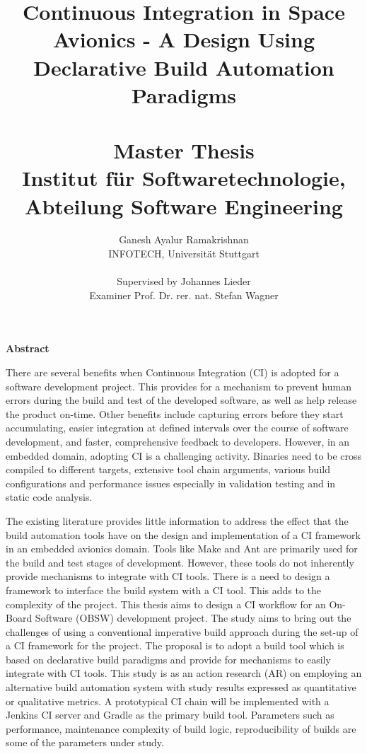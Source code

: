 \documentclass[12pt, a4paper, titlepage]{scrartcl}
\title{Continuous Integration in Space Avionics - A Design Using Declarative Build Automation Paradigms\\
\ \\
{\large Master Thesis \\
	Institut für Softwaretechnologie, \\
	Abteilung Software Engineering
\\
}
}
\author{Ganesh Ayalur Ramakrishnan  \\
  INFOTECH, Universität Stuttgart  \\
  \\
  Supervised by Johannes Lieder \\
  Examiner Prof. Dr. rer. nat. Stefan Wagner
}
\begin{document}
\maketitle

\textbf{Abstract}
\par There are several benefits when Continuous Integration (CI) is adopted for a software
development project. This provides for a mechanism to prevent human errors during
the build and test of the developed software, as well as help release the product on-time.
Other benefits include capturing errors before they start accumulating, easier integration
at defined intervals over the course of software development, and faster, comprehensive
feedback to developers. However, in an embedded domain, adopting CI is a challenging
activity. Binaries need to be cross compiled to different targets, extensive tool chain
arguments, various build configurations and performance issues especially in validation
testing and in static code analysis.
\par The existing literature provides little information to address the effect that the build
automation tools have on the design and implementation of a CI framework in an embedded
avionics domain. Tools like Make and Ant are primarily used for the build and
test stages of development. However, these tools do not inherently provide mechanisms
to integrate with CI tools. There is a need to design a framework to interface the build
system with a CI tool. This adds to the complexity of the project.
This thesis aims to design a CI workflow for an On-Board Software (OBSW) development
project. The study aims to bring out the challenges of using a conventional imperative
build approach during the set-up of a CI framework for the project. The proposal
is to adopt a build tool which is based on declarative build paradigms and provide
for mechanisms to easily integrate with CI tools. This study is as an action research
(AR) on employing an alternative build automation system with study results expressed
as quantitative or qualitative metrics. A prototypical CI chain will be implemented
with a Jenkins CI server and Gradle as the primary build tool. Parameters such as
performance, maintenance complexity of build logic, reproducibility of builds are some
of the parameters under study.
\end{document}
